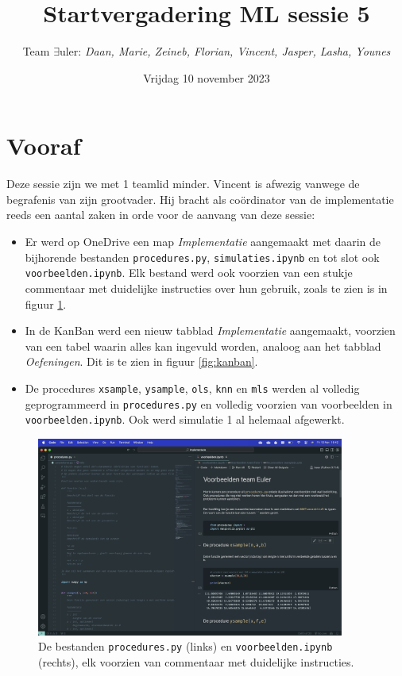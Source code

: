 \documentclass{article}
\title{Startvergadering ML sessie 5}
\author{Team $\exists$uler: \textit{Daan, Marie, Zeineb, Florian, Vincent, Jasper, Lasha, Younes}}
\date{Vrijdag 10 november 2023}
\begin{document}
	
	\maketitle
	
	\section*{Vooraf}
	
	Deze sessie zijn we met 1 teamlid minder. Vincent is afwezig vanwege de begrafenis van zijn grootvader. Hij bracht als coördinator van de implementatie reeds een aantal zaken in orde voor de aanvang van deze sessie:
	
	\begin{itemize}
		\item Er werd op OneDrive een map \textit{Implementatie} aangemaakt met daarin de bijhorende bestanden \texttt{procedures.py}, \texttt{simulaties.ipynb} en tot slot ook \texttt{voorbeelden.ipynb}. Elk bestand werd ook voorzien van een stukje commentaar met duidelijke instructies over hun gebruik, zoals te zien is in figuur \ref{fig:bestanden}.
		\item In de KanBan werd een nieuw tabblad \textit{Implementatie} aangemaakt, voorzien van een tabel waarin alles kan ingevuld worden, analoog aan het tabblad \textit{Oefeningen}. Dit is te zien in figuur \ref{fig:kanban}.
		\item De procedures \texttt{xsample}, \texttt{ysample}, \texttt{ols}, \texttt{knn} en \texttt{mls} werden al volledig geprogrammeerd in \texttt{procedures.py} en volledig voorzien van voorbeelden in \texttt{voorbeelden.ipynb}. Ook werd simulatie 1 al helemaal afgewerkt.
	\end{itemize}
	
	\begin{figure}
		\centering
		\includegraphics[width=0.9\textwidth]{bestanden}
		\caption{De bestanden \texttt{procedures.py} (links) en \texttt{voorbeelden.ipynb} (rechts), elk voorzien van commentaar met duidelijke instructies.}
		\label{fig:bestanden}
	\end{figure}
	
\end{document}
